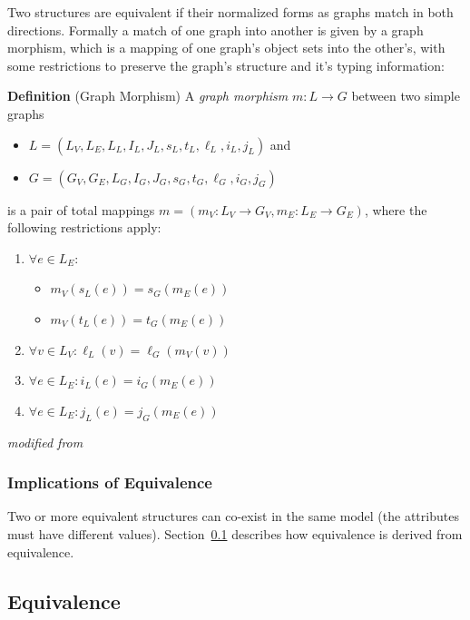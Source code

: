 \documentclass{cekarticle}
\begin{document}
Two  structures are equivalent if their normalized forms as 
graphs match in both directions.  Formally a match of one graph into another is given by a
graph morphism, which is a mapping of one graph's object
sets into the other's, with some restrictions to preserve the graph's structure and it's typing
information:

\textbf{Definition} (Graph Morphism) A \emph{graph morphism} $m : L \rightarrow G$ between two
simple graphs
\begin{itemize}
\item $L = (L_{V}, L_{E}, L_{L}, I_{L}, J_{L}, s_{L}, t_{L}, \ell_{L}, i_{L}, j_{L})$ and
\item $G = (G_{V}, G_{E}, L_{G}, I_{G}, J_{G}, s_{G}, t_{G}, \ell_{G}, i_{G}, j_{G})$
\end{itemize}
is a pair of total mappings
$m = (m_{V} : L_{V} \rightarrow G_{V}, m_{E} : L_{E} \rightarrow G_{E})$,
where the following restrictions apply:

\begin{enumerate}
\item $\forall e \in L_{E} : $
    \begin{itemize}
    \item $m_{V}(s_{L}(e))= s_{G}(m_{E}(e))$
    \item $m_{V}(t_{L}(e))= t_{G}(m_{E}(e))$
    \end{itemize}
\item $\forall v \in L_{V} : \ell_{L}(v) = \ell_{G}(m_{V}(v))$
\item $\forall e \in L_{E} : i_{L}(e) = i_{G}(m_{E}(e))$
\item $\forall e \in L_{E} : j_{L}(e) = j_{G}(m_{E}(e))$
\end{enumerate}

\emph{modified from \citep{rudolf:1998}}

\subsubsection{Implications of  Equivalence}

Two or more equivalent  structures can co-exist in the same model
(the  attributes must have different values).  Section~\ref{sec:species-equals}
describes how  equivalence is derived from  equivalence.

\subsection{ Equivalence}
\label{sec:species-equals}
\end{document}
